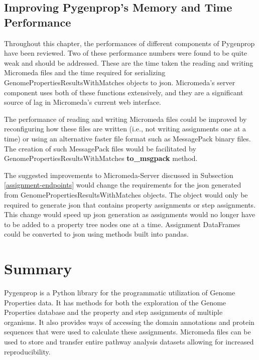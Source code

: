 \subsection{Improving Pygenprop's Memory and Time Performance} \label{improving-pygenprop-performance}

Throughout this chapter, the performances of different components of Pygenprop have been reviewed. Two of these performance numbers were found to be quite weak and should be addressed. These are the time taken the reading and writing Micromeda files and the time required for serializing GenomePropertiesResultsWithMatches objects to \gls{json}. Micromeda's server component uses both of these functions extensively, and they are a significant source of lag in Micromeda's current web interface.

The performance of reading and writing Micromeda files could be improved by reconfiguring how these files are written (i.e., not writing assignments one at a time) or using an alternative faster file format such as MessagePack binary files. The creation of such MessagePack files would be facilitated by GenomePropertiesResultsWithMatches \textbf{to\_msgpack} method. 
 
The suggested improvements to Micromeda-Server discussed in Subsection \ref{assignment-endpoints} would change the requirements for the \gls{json} generated from GenomePropertiesResultsWithMatches objects. The object would only be required to generate \gls{json} that contains property assignments or step assignments. This change would speed up \gls{json} generation as assignments would no longer have to be added to a property tree nodes one at a time. Assignment DataFrames could be converted to \gls{json} using methods built into pandas.

\section{Summary}

Pygenprop is a Python library for the programmatic utilization of Genome Properties data. It has methods for both the exploration of the Genome Properties database and the property and step assignments of multiple organisms. It also provides ways of accessing the domain annotations and protein sequences that were used to calculate these assignments. Micromeda files can be used to store and transfer entire pathway analysis datasets allowing for increased reproducibility.


